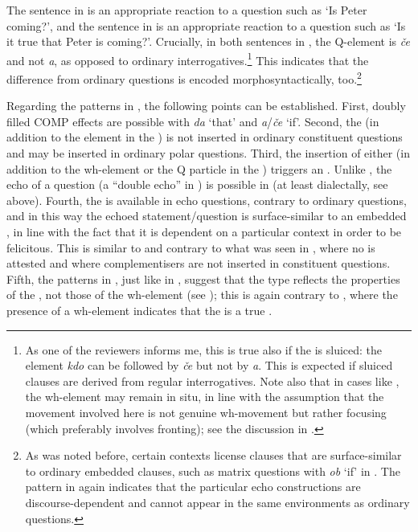 \documentclass[output=paper,modfonts, hidelinks, newtxmath]{langscibook}
\begin{document}
\largerpage[-1]
\noindent The sentence in  is an appropriate reaction to a question such as `Is Peter coming?', and the sentence in  is an appropriate reaction to a question such as `Is it true that Peter is coming?'. Crucially, in both sentences in , the Q-element is \textit{če} and not \textit{a}, as opposed to ordinary  interrogatives.\footnote{As one of the reviewers informs me, this is true also if the  is sluiced: the element \textit{kdo} can be followed by \textit{če} but not by \textit{a}. This is expected if sluiced clauses are derived from regular interrogatives. Note also that in cases like , the wh-element may remain in situ, in line with the assumption that the movement involved here is not genuine wh-movement but rather focusing (which preferably involves fronting); see the discussion in .} This indicates that the difference from ordinary questions is encoded morphosyntactically, too.\footnote{As was noted before, certain contexts license clauses that are surface-similar to ordinary embedded clauses, such as matrix questions with \textit{ob} `if' in . The pattern in  again indicates that the particular echo constructions are discourse-dependent and cannot appear in the same environments as ordinary  questions.}

Regarding the  patterns in , the following points can be established. First, doubly filled COMP effects are possible with \textit{da} `that' and \textit{a}/\textit{če} `if'. Second, the  (in addition to the element in the ) is not inserted in ordinary constituent questions and may be inserted in ordinary polar questions. Third, the insertion of either  (in addition to the wh-element or the Q particle in the ) triggers an . Unlike , the echo of a question (a ``double echo'' in \citealt{hladnik2010}) is possible in  (at least dialectally, see  above). Fourth, the  is available in  echo questions, contrary to ordinary  questions, and in this way the echoed statement/question is surface-similar to an embedded , in line with the fact that it is dependent on a particular context in order to be felicitous. This is similar to  and contrary to what was seen in , where no  is attested and where complementisers are not inserted in  constituent questions. Fifth, the patterns in , just like in , suggest that the  type reflects the properties of the , not those of the wh-element (see ); this is again contrary to , where the presence of a wh-element indicates that the  is a true .
\end{document}

